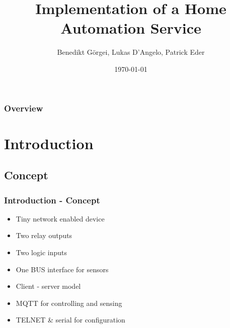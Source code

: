 \documentclass[aspectratio=169]{beamer}
\title[Smart Services Development]{Implementation of a Home Automation Service} %
\author{Benedikt Görgei, Lukas D'Angelo, Patrick Eder} %
\institute[] %
{
Technische Universität Graz \\ %
\medskip
\texttt{benedikt.goergei@student.tugraz.at, lukas.dangelo@student.tugraz.at, patrick.eder@student.tugraz.at} %
}
\date{\today} %
\begin{document}
\begin{frame}
\titlepage %
\end{frame}

\begin{frame}
\frametitle{Overview} %
\tableofcontents %
\end{frame}


\section{Introduction} %
\subsection{Concept}
\begin{frame}
\frametitle{Introduction - Concept}
\begin{itemize}
\item Tiny network enabled device
\item Two relay outputs
\item Two logic inputs
\item One BUS interface for sensors
\item Client - server model
\item MQTT for controlling and sensing
\item TELNET \& serial for configuration 
\end{itemize}
\end{frame}
\end{document}
